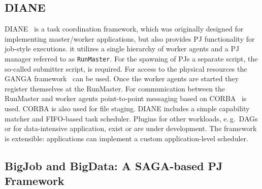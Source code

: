 \documentclass[conference]{IEEEtran}
\begin{document}
\subsection{DIANE}
DIANE~\cite{Moscicki:908910} is a task coordination framework, which
was originally designed for implementing master/worker applications,
but also provides PJ functionality for job-style executions. it
utilizes a single hierarchy of worker agents and a PJ manager referred
to as \texttt{RunMaster}.  For the spawning of PJs a separate script,
the so-called submitter script, is required. For access to the
physical resources the GANGA framework~\cite{Moscicki20092303} can be
used.  Once the worker agents are started they register themselves at
the RunMaster.  For communication between the RunMaster and worker
agents point-to-point messaging based on
CORBA~\cite{OMG-CORBA303:2004} is used. CORBA is also used for file
staging.  DIANE includes a simple capability matcher and FIFO-based
task scheduler.  Plugins for other workloads, e.\,g.\ DAGs or for
data-intensive application, exist or are under development. The
framework is extensible: applications can implement a custom
application-level scheduler.


\subsection{BigJob and BigData: A SAGA-based PJ Framework}
\label{sec:bigjob_description}









\end{document}
